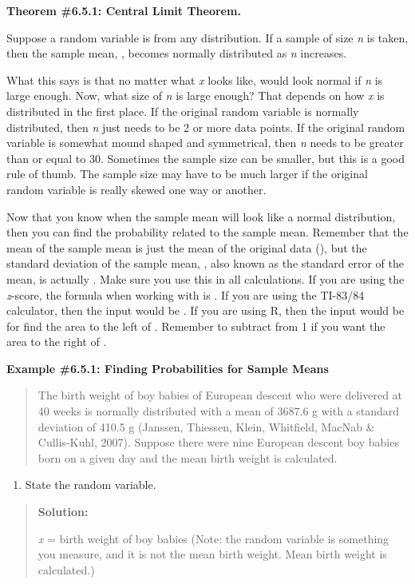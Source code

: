 \documentclass[]{book}
\providecommand{\tightlist}{%
  \setlength{\itemsep}{0pt}\setlength{\parskip}{0pt}}
\begin{document}
\textbf{Theorem \#6.5.1: Central Limit Theorem.}

Suppose a random variable is from any distribution. If a sample of size
\emph{n} is taken, then the sample mean, , becomes normally distributed as
\emph{n} increases.

What this says is that no matter what \emph{x} looks like, would look normal
if \emph{n} is large enough. Now, what size of \emph{n} is large enough? That
depends on how \emph{x} is distributed in the first place. If the original
random variable is normally distributed, then \emph{n} just needs to be 2 or
more data points. If the original random variable is somewhat mound
shaped and symmetrical, then \emph{n} needs to be greater than or equal to
30. Sometimes the sample size can be smaller, but this is a good rule of
thumb. The sample size may have to be much larger if the original random
variable is really skewed one way or another.

Now that you know when the sample mean will look like a normal
distribution, then you can find the probability related to the sample
mean. Remember that the mean of the sample mean is just the mean of the
original data (), but the standard deviation of the sample mean, , also
known as the standard error of the mean, is actually . Make sure you use
this in all calculations. If you are using the \emph{z}-score, the formula
when working with is . If you are using the TI-83/84 calculator, then
the input would be . If you are using R, then the input would be for
find the area to the left of . Remember to subtract from 1 if you want
the area to the right of .

\textbf{Example \#6.5.1: Finding Probabilities for Sample Means}

\begin{quote}
The birth weight of boy babies of European descent who were delivered
at 40 weeks is normally distributed with a mean of 3687.6 g with a
standard deviation of 410.5 g (Janssen, Thiessen, Klein, Whitfield,
MacNab \& Cullis-Kuhl, 2007). Suppose there were nine European descent
boy babies born on a given day and the mean birth weight is
calculated.
\end{quote}

\begin{enumerate}
\def\labelenumi{\alph{enumi}.}
\tightlist
\item
  State the random variable.
\end{enumerate}

\begin{quote}
\textbf{Solution:}

\emph{x} = birth weight of boy babies (Note: the random variable is
something you measure, and it is not the mean birth weight. Mean birth
weight is calculated.)
\end{quote}
\end{document}
